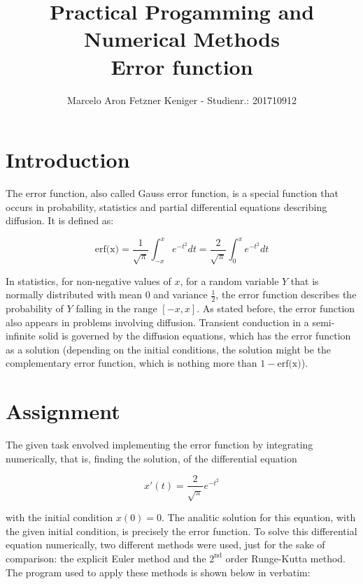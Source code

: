 \documentclass[a4paper,12pt]{article}
\title{Practical Progamming and Numerical Methods \\ Error function}
\author{Marcelo Aron Fetzner Keniger - Studienr.: 201710912}
\newcommand{\tab}[1][1cm]{\hspace*{#1}}
\begin{document}
\maketitle

\section{Introduction}
\tab The error function, also called Gauss error function, is a special function that occurs in probability, statistics and partial differential equations describing diffusion. It is defined as:

\begin{equation}
    \text{erf(x)} = \frac{1}{\sqrt{\pi}} \int_{-x}^{x} e^{-t^2} dt = \frac{2}{\sqrt{\pi}} \int_{0}^{x} e^{-t^2} dt  
\end{equation}

In statistics, for non-negative values of $x$, for a random variable $Y$ that is normally distributed with mean $0$ and variance $\frac{1}{2}$, the error function describes the probability of $Y$ falling in the range $[-x,x]$. As stated before, the error function also appears in problems involving diffusion. Transient conduction in a semi-infinite solid is governed by the diffusion equations, which has the error function as a solution (depending on the initial conditions, the solution might be the complementary error function, which is nothing more than $1-\text{erf(x)}$).

\section{Assignment}
\tab The given task envolved implementing the error function by integrating numerically, that is, finding the solution, of the differential equation

\begin{equation}
    x'(t) = \frac{2}{\sqrt{\pi}} e^{-t^2}
\end{equation}

with the initial condition $x(0) = 0$. The analitic solution for this equation, with the given initial condition, is precisely the error function. To solve this differential equation numerically, two different methods were used, just for the sake of comparison: the explicit Euler method and the $2^\text{nd}$ order Runge-Kutta method. The program used to apply these methods is shown below in verbatim:
\end{document}
